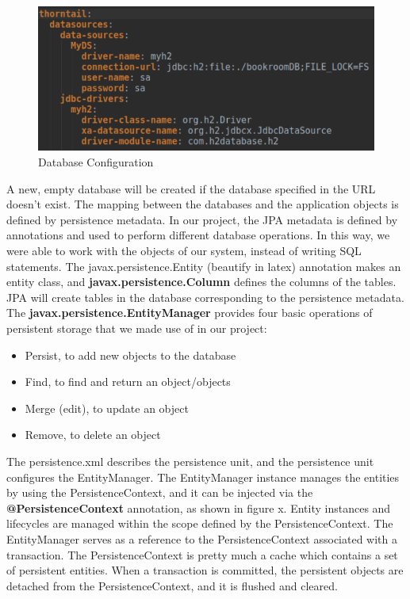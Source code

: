 \begin{figure}[ht]
  \centering
  \includegraphics[scale=0.9]{figs/databaseconfig.png}
  \caption{Database Configuration}
  \label{fig:databaseconfig}
\end{figure}
\newpage
\noindent A new, empty database will be created if the database specified in the URL doesn’t exist. The mapping between the databases and the application objects is defined by persistence metadata. In our project, the JPA metadata is defined by annotations and used to perform different database operations. In this way, we were able to work with the objects of our system, instead of writing SQL statements. The javax.persistence.Entity  (beautify in latex) annotation makes an entity class, and \textbf{javax.persistence.Column} defines the columns of the tables. JPA will create tables in the database corresponding to the persistence metadata. The \textbf{javax.persistence.EntityManager} provides four basic operations of persistent storage that we made use of in our project:

\begin{itemize}
    \item Persist, to add new objects to the database
    \item Find, to find and return an object/objects
    \item Merge (edit), to update an object
    \item Remove, to delete an object
\end{itemize}

\noindent The persistence.xml describes the persistence unit, and the persistence unit configures the EntityManager. The EntityManager instance manages the entities by using the PersistenceContext, and it can be injected via the \textbf{@PersistenceContext} annotation, as shown in figure x. Entity instances and lifecycles are managed within the scope defined by the PersistenceContext. The EntityManager serves as a reference to the PersistenceContext associated with a transaction. The PersistenceContext is pretty much a cache which contains a set of persistent entities. When a transaction is committed, the persistent objects are detached from the PersistenceContext, and it is flushed and cleared.\\

